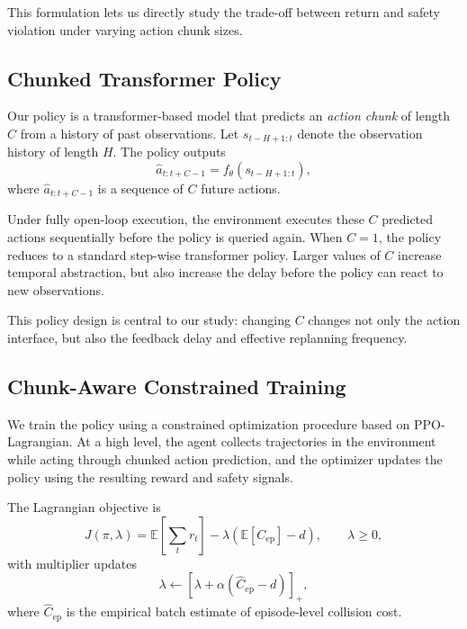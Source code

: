 \documentclass{article}
\begin{document}
This formulation lets us directly study the trade-off between return and safety violation under varying action chunk sizes.

\subsection{Chunked Transformer Policy}

Our policy is a transformer-based model that predicts an \emph{action chunk} of length $C$ from a history of past observations. Let $s_{t-H+1:t}$ denote the observation history of length $H$. The policy outputs
\begin{equation}
\hat{a}_{t:t+C-1} = f_{\theta}(s_{t-H+1:t}),
\end{equation}
where $\hat{a}_{t:t+C-1}$ is a sequence of $C$ future actions.

Under fully open-loop execution, the environment executes these $C$ predicted actions sequentially before the policy is queried again. When $C=1$, the policy reduces to a standard step-wise transformer policy. Larger values of $C$ increase temporal abstraction, but also increase the delay before the policy can react to new observations.

This policy design is central to our study: changing $C$ changes not only the action interface, but also the feedback delay and effective replanning frequency.

\subsection{Chunk-Aware Constrained Training}

We train the policy using a constrained optimization procedure based on PPO-Lagrangian. At a high level, the agent collects trajectories in the environment while acting through chunked action prediction, and the optimizer updates the policy using the resulting reward and safety signals.

The Lagrangian objective is
\begin{equation}
J(\pi, \lambda)
=
\mathbb{E}\left[\sum_t r_t\right]
-
\lambda \left(\mathbb{E}[C_{\mathrm{ep}}] - d\right),
\qquad \lambda \ge 0,
\end{equation}
with multiplier updates
\begin{equation}
\lambda \leftarrow \left[\lambda + \alpha (\hat{C}_{\mathrm{ep}} - d)\right]_+,
\end{equation}
where $\hat{C}_{\mathrm{ep}}$ is the empirical batch estimate of episode-level collision cost.
\end{document}
